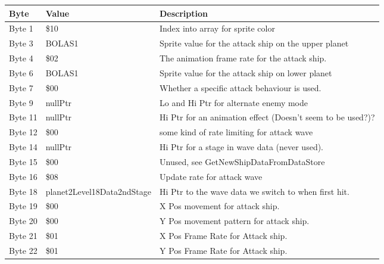 \begin{figure}[H]
{\begin{adjustbox}{width=12cm}
\begin{tabular}{lll}
\toprule
 Byte    & Value                      & Description                                                        \\
\midrule
 Byte 1  & \$10                        & Index into array for sprite color                                  \\
 Byte 3  & BOLAS1                     & Sprite value for the attack ship on the upper planet               \\
 Byte 4  & \$02                        & The animation frame rate for the attack ship.                      \\
 Byte 6  & BOLAS1                     & Sprite value for the attack ship on lower planet                   \\
 Byte 7  & \$00                        & Whether a specific attack behaviour is used.                       \\
 Byte 9  & nullPtr                    & Lo and Hi Ptr for alternate enemy mode                             \\
 Byte 11 & nullPtr                    & Hi Ptr for an animation effect (Doesn't seem to be used?)?         \\
 Byte 12 & \$00                        & some kind of rate limiting for attack wave                         \\
 Byte 14 & nullPtr                    & Hi Ptr for a stage in wave data (never used).                      \\
 Byte 15 & \$00                        & Unused, see GetNewShipDataFromDataStore                            \\
 Byte 16 & \$08                        & Update rate for attack wave                                        \\
 Byte 18 & planet2Level18Data2ndStage & Hi Ptr to the wave data we switch to when first hit.               \\
 Byte 19 & \$00                        & X Pos movement for attack ship.                                    \\
 Byte 20 & \$00                        & Y Pos movement pattern for attack ship.                            \\
 Byte 21 & \$01                        & X Pos Frame Rate for Attack ship.                                  \\
 Byte 22 & \$01                        & Y Pos Frame Rate for Attack ship.                                  \\

\end{tabular}
\end{adjustbox}}
\end{figure}
